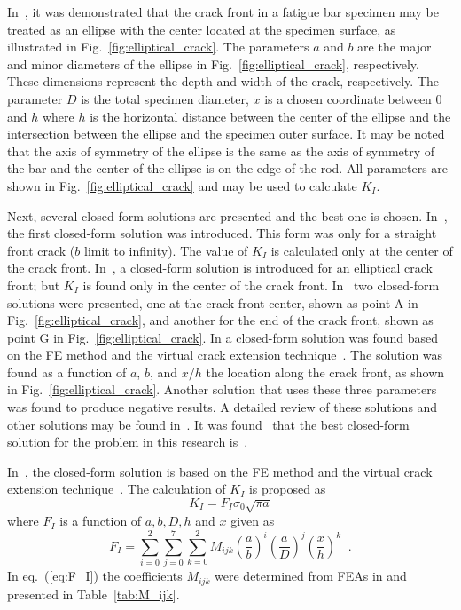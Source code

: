 \documentclass[preprint,12pt]{elsarticle}
\begin{document}
In~\cite{toribio2009automated}, it was demonstrated that the crack front in a fatigue bar specimen may be treated as an ellipse with the center located at the specimen surface, as illustrated in Fig.~\ref{fig:elliptical_crack}. The parameters $a$ and $b$ are the major and minor diameters of the ellipse in Fig.~\ref{fig:elliptical_crack}, respectively. These dimensions represent the depth and width of the crack, respectively. The parameter $D$ is the total specimen diameter, $x$ is a chosen coordinate between 0 and $h$ where $h$ is the horizontal distance between the center of the ellipse and the intersection between the ellipse and the specimen outer surface. It may be noted that the axis of symmetry of the ellipse is the same as the axis of symmetry of the bar and the center of the ellipse is on the edge of the rod. All parameters are shown in Fig.~\ref{fig:elliptical_crack} and may be used to calculate $K_I$.

Next, several closed-form solutions are presented and the best one is chosen. In~\cite{valiente1980criterios}, the first closed-form solution was introduced. This form was only for a straight front crack ($b$ limit to infinity). The value of $K_I$ is calculated only at the center of the crack front.
In~\cite{astiz1986incompatible}, a closed-form solution is introduced for an elliptical crack front; but $K_I$ is found only in the center of the crack front. In~\cite{couroneau1998simplified,carpinteri1992elliptical} two closed-form solutions were presented, one at the crack front center, shown as point A in Fig.~\ref{fig:elliptical_crack}, and another for the end of the crack front, shown as point G in Fig.~\ref{fig:elliptical_crack}. In \cite{shin2004experimental} a closed-form solution was found based on the FE method and the virtual crack extension technique~\cite{hellen1975method}. The solution was found as a function of $a$, $b$, and $x/h$ the location along the crack front, as shown in Fig.~\ref{fig:elliptical_crack}.
Another solution that uses these three parameters~\cite{shih2002stress} was found to produce negative results. A detailed review of these solutions and other solutions may be found in~\cite{toribio2009automated}.
It was found~\cite{toribio2009automated} that the best closed-form solution for the problem in this research is~\cite{shih2002stress}.


In~\cite{shin2004experimental}, the closed-form solution is based on the FE method and the virtual crack extension technique~\cite{hellen1975method}.  The calculation of \(K_I\) is proposed as
%
\begin{equation}
\label{eq:K_I__F_I}
K_{I}=F_I \sigma_0 \sqrt{\pi a}
\end{equation}
%
where $F_I$ is a function of $a, b, D, h$ and $x$ given as
%
\begin{equation}
\label{eq:F_I}
F_{I}=\sum^{2}_{i=0} \sum^{7}_{j=0}\sum^{2}_{k=0} M_{ijk}\left(\frac{a}{b}\right)^i  \left(\frac{a}{D}\right)^j  \left(\frac{x}{h}\right)^k\;\;.
\end{equation}
In eq.~(\ref{eq:F_I}) the coefficients $M_{ijk}$ were determined from FEAs in \cite{shin2004experimental} and presented in Table~\ref{tab:M_ijk}.
\end{document}
